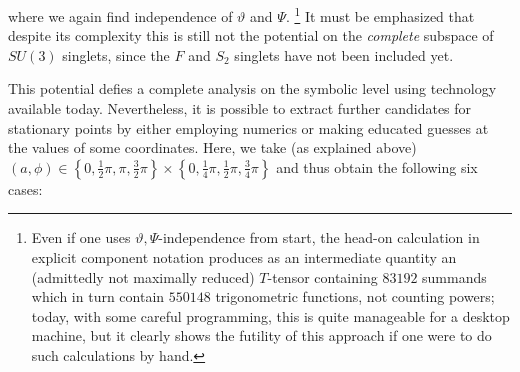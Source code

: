 \documentclass[a4paper,12pt]{article}
\begin{document}
%
where we again find independence of $\vartheta$ and $\Psi$.%
\footnote{Even if one uses $\vartheta,\Psi$-independence from start,
the head-on calculation in explicit component notation produces as an
intermediate quantity an (admittedly not maximally reduced) $T$-tensor
containing $83192$ summands which in turn contain $550148$
trigonometric functions, not counting powers; today, with some careful
programming, this is quite manageable for a desktop machine, but it
clearly shows the futility of this approach if one were to do such
calculations by hand.}  It must be emphasized that despite its
complexity this is still not the potential on the {\em complete}
subspace of $SU(3)$ singlets, since the $F$ and $S_2$ singlets have
not been included yet.

This potential defies a complete analysis on the symbolic level using
technology available today. Nevertheless, it is possible to extract
further candidates for stationary points by either employing numerics
or making educated guesses at the values of some coordinates. Here, we
take (as explained above) $(a,\phi)\in\left\{0,
\frac{1}{2}\pi,\pi,\frac{3}{2}\pi\right\}\times
\left\{0, \frac{1}{4}\pi, \frac{1}{2}\pi, \frac{3}{4}\pi\right\}$ and thus obtain the following six cases:
\vfill
\end{document}
